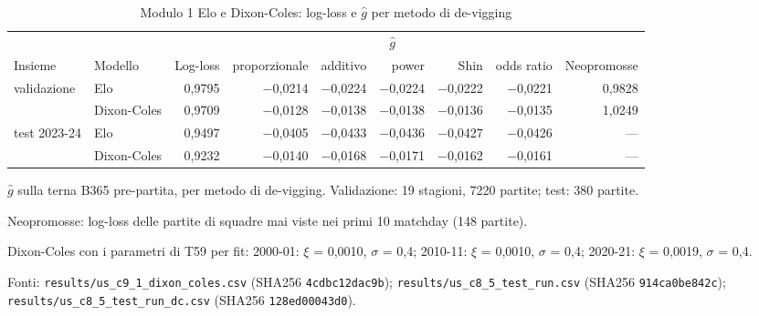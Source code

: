 \begin{table}[htbp]
\centering
\small
\setlength{\tabcolsep}{4pt}
\caption{Modulo 1 Elo e Dixon-Coles: log-loss e $\hat g$ per metodo di de-vigging}
\label{tab:s11_dixon_coles}
\begin{tabular}{llrrrrrrr}
\toprule
 &  &  & \multicolumn{5}{c}{$\hat g$} &  \\
\cmidrule(lr){4-8}
Insieme & Modello & Log-loss & proporzionale & additivo & power & Shin & odds ratio & Neopromosse \\
\midrule
validazione & Elo & 0,9795 & $-$0,0214 & $-$0,0224 & $-$0,0224 & $-$0,0222 & $-$0,0221 & 0,9828 \\
 & Dixon-Coles & 0,9709 & $-$0,0128 & $-$0,0138 & $-$0,0138 & $-$0,0136 & $-$0,0135 & 1,0249 \\
\midrule
test 2023-24 & Elo & 0,9497 & $-$0,0405 & $-$0,0433 & $-$0,0436 & $-$0,0427 & $-$0,0426 & --- \\
 & Dixon-Coles & 0,9232 & $-$0,0140 & $-$0,0168 & $-$0,0171 & $-$0,0162 & $-$0,0161 & --- \\
\bottomrule
\end{tabular}

\smallskip
\begin{minipage}{\linewidth}
\footnotesize
$\hat g$ sulla terna B365 pre-partita, per metodo di de-vigging. Validazione: 19 stagioni, 7220 partite; test: 380 partite.\par
Neopromosse: log-loss delle partite di squadre mai viste nei primi 10 matchday (148 partite).\par
Dixon-Coles con i parametri di T59 per fit: 2000-01: $\xi$ = 0,0010, $\sigma$ = 0,4; 2010-11: $\xi$ = 0,0010, $\sigma$ = 0,4; 2020-21: $\xi$ = 0,0019, $\sigma$ = 0,4.\par
Fonti: \texttt{results/us\_c9\_1\_dixon\_coles.csv} (SHA256 \texttt{4cdbc12dac9b}); \texttt{results/us\_c8\_5\_test\_run.csv} (SHA256 \texttt{914ca0be842c}); \texttt{results/us\_c8\_5\_test\_run\_dc.csv} (SHA256 \texttt{128ed00043d0}).
\end{minipage}
\end{table}
